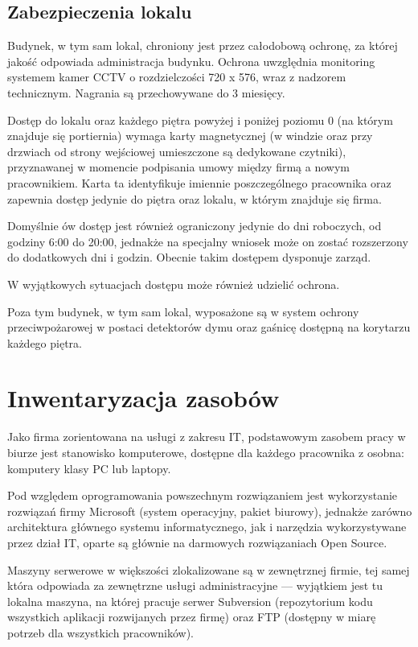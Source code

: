 \documentclass{article}
\begin{document}
        \subsection{Zabezpieczenia lokalu}
            Budynek, w tym sam lokal, chroniony jest przez całodobową ochronę, za której jakość odpowiada administracja budynku.
            Ochrona uwzględnia monitoring systemem kamer CCTV o rozdzielczości 720 x 576, wraz z nadzorem technicznym.
            Nagrania są przechowywane do 3 miesięcy.

            Dostęp do lokalu oraz każdego piętra powyżej i poniżej poziomu 0 (na którym znajduje się portiernia) wymaga karty magnetycznej (w windzie oraz przy drzwiach od strony wejściowej umieszczone są dedykowane czytniki), przyznawanej w momencie podpisania umowy między firmą a nowym pracownikiem. Karta ta identyfikuje imiennie poszczególnego pracownika oraz zapewnia dostęp jedynie do piętra oraz lokalu, w którym znajduje się firma.

            Domyślnie ów dostęp jest również ograniczony jedynie do dni roboczych, od godziny 6:00 do 20:00, jednakże na specjalny wniosek może on zostać rozszerzony do dodatkowych dni i godzin. Obecnie takim dostępem dysponuje zarząd.

            W wyjątkowych sytuacjach dostępu może również udzielić ochrona.

            Poza tym budynek, w tym sam lokal, wyposażone są w system ochrony przeciwpożarowej w postaci detektorów dymu oraz gaśnicę dostępną na korytarzu każdego piętra.

    \newpage
    \section{Inwentaryzacja zasobów}
        Jako firma zorientowana na usługi z zakresu IT, podstawowym zasobem pracy w biurze jest stanowisko komputerowe, dostępne dla każdego pracownika z osobna: komputery klasy PC lub laptopy.

        Pod względem oprogramowania powszechnym rozwiązaniem jest wykorzystanie rozwiązań firmy Microsoft (system operacyjny, pakiet biurowy), jednakże zarówno architektura głównego systemu informatycznego, jak i narzędzia wykorzystywane przez dział IT, oparte są głównie na darmowych rozwiązaniach Open Source.

        Maszyny serwerowe w większości zlokalizowane są w zewnętrznej firmie, tej samej która odpowiada za zewnętrzne usługi administracyjne --- wyjątkiem jest tu lokalna maszyna, na której pracuje serwer Subversion (repozytorium kodu wszystkich aplikacji rozwijanych przez firmę) oraz FTP (dostępny w miarę potrzeb dla wszystkich pracowników).
\end{document}
